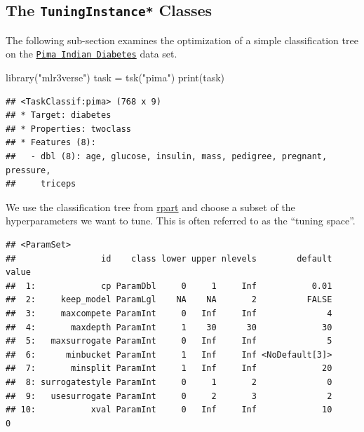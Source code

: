 \documentclass[
]{scrbook}
\newenvironment{Shaded}{\begin{snugshade}}{\end{snugshade}}
\newcommand{\FunctionTok}[1]{\textcolor[rgb]{0.00,0.00,0.00}{#1}}
\newcommand{\NormalTok}[1]{#1}
\newcommand{\OtherTok}[1]{\textcolor[rgb]{0.56,0.35,0.01}{#1}}
\newcommand{\SpecialCharTok}[1]{\textcolor[rgb]{0.00,0.00,0.00}{#1}}
\newcommand{\StringTok}[1]{\textcolor[rgb]{0.31,0.60,0.02}{#1}}
\renewenvironment{Shaded} {\begin{snugshade}\small} {\end{snugshade}}
\begin{document}
\hypertarget{tuning-optimization}{%
\subsection{\texorpdfstring{The \texttt{TuningInstance*} Classes}{The TuningInstance* Classes}}\label{tuning-optimization}}

The following sub-section examines the optimization of a simple classification tree on the \href{https://mlr3.mlr-org.com/reference/mlr_tasks_pima.html}{\texttt{Pima\ Indian\ Diabetes}} data set.

\begin{Shaded}
\begin{Highlighting}[]
\FunctionTok{library}\NormalTok{(}\StringTok{"mlr3verse"}\NormalTok{)}
\NormalTok{task }\OtherTok{=} \FunctionTok{tsk}\NormalTok{(}\StringTok{"pima"}\NormalTok{)}
\FunctionTok{print}\NormalTok{(task)}
\end{Highlighting}
\end{Shaded}

\begin{verbatim}
## <TaskClassif:pima> (768 x 9)
## * Target: diabetes
## * Properties: twoclass
## * Features (8):
##   - dbl (8): age, glucose, insulin, mass, pedigree, pregnant, pressure,
##     triceps
\end{verbatim}

We use the classification tree from \href{https://cran.r-project.org/package=rpart}{rpart} and choose a subset of the hyperparameters we want to tune.
This is often referred to as the ``tuning space''.

\begin{Shaded}
\end{Shaded}

\begin{verbatim}
## <ParamSet>
##                 id    class lower upper nlevels        default value
##  1:             cp ParamDbl     0     1     Inf           0.01      
##  2:     keep_model ParamLgl    NA    NA       2          FALSE      
##  3:     maxcompete ParamInt     0   Inf     Inf              4      
##  4:       maxdepth ParamInt     1    30      30             30      
##  5:   maxsurrogate ParamInt     0   Inf     Inf              5      
##  6:      minbucket ParamInt     1   Inf     Inf <NoDefault[3]>      
##  7:       minsplit ParamInt     1   Inf     Inf             20      
##  8: surrogatestyle ParamInt     0     1       2              0      
##  9:   usesurrogate ParamInt     0     2       3              2      
## 10:           xval ParamInt     0   Inf     Inf             10     0
\end{verbatim}
\end{document}
